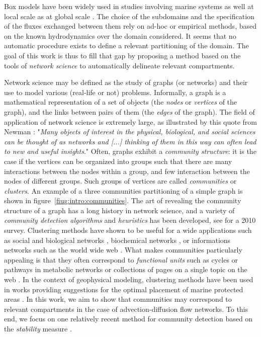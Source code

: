 Box models have been widely used in studies involving marine systems as well at local scale \cite{deleersnijder1998two,maderich2014regional,soetaert1995estimating} as at global scale \cite{kohler2005quantitative,munhoven1996glacial}. The choice of the subdomains and the specification of the fluxes exchanged between them rely on ad-hoc or empirical methods, based on the known hydrodynamics over the domain considered. It seems that no automatic procedure exists to define a relevant partitioning of the domain. The goal of this work is thus to fill that gap by proposing a method based on the tools of \textit{network science} to automatically delineate relevant compartments.

Network science may be defined as the study of graphs (or networks) and their use to model various (real-life or not) problems. Informally, a graph is a mathematical representation of a set of objects (the \textit{nodes} or \textit{vertices} of the graph), and the links between pairs of them (the \textit{edges} of the graph). The field of application of network science is extremely large, as illustrated by this quote from Newman \cite{newman2010networks}: "\textit{Many objects of interest in the physical, biological, and social sciences can be thought of as networks and [...] thinking of them in this way can often lead to new and useful insights}."
\newpage
Often, graphs exhibit a \textit{community structure}: it is the case if the vertices can be organized into groups such that there are many interactions between the nodes within a group, and few interaction between the nodes of different groups. Such groups of vertices are called \textit{communities} or \textit{clusters}. An example of a three communities partitioning of a simple graph is shown in figure~\ref{fiug:intro:communities}. The art of revealing the community structure of a graph has a long history in network science, and a variety of \textit{community detection algorithms} and \textit{heuristics} has been developed, see \cite{fortunato2010community} for a 2010 survey. Clustering methods have shown to be useful for a wide applications such as social and biological networks \cite{girvan2002community}, biochemical networks \cite{holme2003subnetwork,guimera2005functional,palla2005uncovering}, or informations networks such as the world wide web \cite{flake2002self}. What makes communities particularly appealing is that they often correspond to \textit{functional units} such as cycles or pathways in metabolic networks \cite{guimera2005functional,palla2005uncovering,huss2007currency} or collections of pages on a single topic on the web \cite{flake2002self}. In the context of geophysical modeling, clustering methods have been used in works providing suggestions for the optimal placement of marine protected areas \cite{thomas2014numerical,jacobi2012identification,rossi2014hydrodynamic}. In this work, we aim to show that communities may correspond to relevant compartments in the case of advection-diffusion flow networks. To this end, we focus on one relatively recent method for community detection based on the \textit{stability} measure \cite{delvenne2010stability,delvenne2013stability,lambiotte2009laplacian}.

